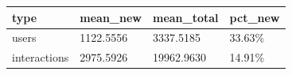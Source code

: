 \begin{tabular}{llll}
\toprule
type & mean_new & mean_total & pct_new \\
\midrule
users & 1122.5556 & 3337.5185 & 33.63\% \\
interactions & 2975.5926 & 19962.9630 & 14.91\% \\
\bottomrule
\end{tabular}
